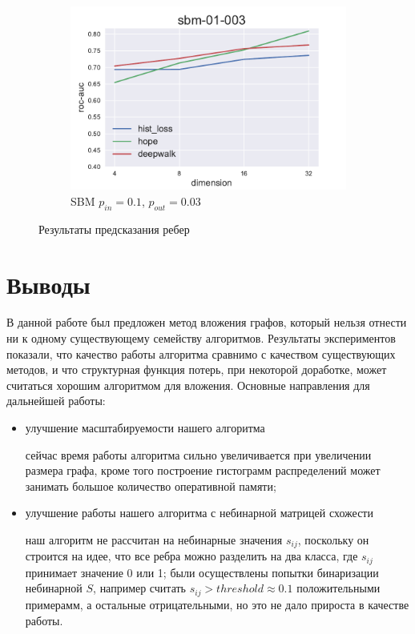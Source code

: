 \documentclass[12pt,a4paper]{extarticle}
\begin{document}
\begin{figure}
\begin{subfigure}{.5\linewidth}
    \includegraphics[width=\linewidth]{src/images/Link_prediction_sbm-01-003.pdf}
    \caption{SBM $p_{in}=0.1$, $p_{out}=0.03$}
    \label{fig:lp_sbm2}
    \end{subfigure}
    \caption{Результаты предсказания ребер}
    \label{fig:lp}
    \end{figure}
    
    \section{Выводы}
    
    В данной работе был предложен метод вложения графов, который нельзя отнести ни к одному существующему семейству алгоритмов. Результаты экспериментов показали, что качество работы алгоритма сравнимо с качеством существующих методов, и что структурная функция потерь, при некоторой доработке, может считаться хорошим алгоритмом для вложения. Основные направления для дальнейшей работы: 
    \begin{itemize}
    \item улучшение масштабируемости нашего алгоритма
    
    сейчас время работы алгоритма сильно увеличивается при увеличении размера графа, кроме того построение гистограмм распределений может занимать большое количество оперативной памяти; 
    \item улучшение работы нашего алгоритма с небинарной матрицей схожести
    
    наш алгоритм не рассчитан на небинарные значения $s_{ij}$, поскольку он строится на идее, что все ребра можно разделить на два класса, где $s_{ij}$ принимает значение 0 или 1; были осуществлены попытки бинаризации небинарной $S$, например считать $s_{ij} > threshold \approx 0.1$ положительными примерамм, а остальные отрицательными, но это не дало прироста в качестве работы.
    \end{itemize}
    
    
    
\end{document}
